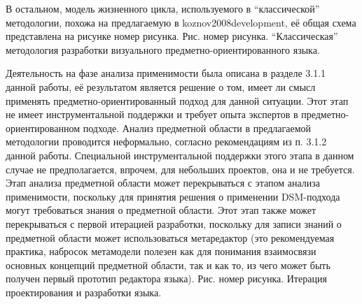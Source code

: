 В остальном, модель жизненного цикла, используемого в “классической” методологии, похожа на предлагаемую в koznov2008development, её общая схема представлена на рисунке номер рисунка.
Рис. номер рисунка. “Классическая” методология разработки визуального предметно-ориентированного языка.

	Деятельность на фазе анализа применимости была описана в разделе 3.1.1 данной работы, её результатом является решение о том, имеет ли смысл применять предметно-ориентированный подход для данной ситуации. Этот этап не имеет инструментальной поддержки и требует опыта экспертов в предметно-ориентированном подходе.
	Анализ предметной области в предлагаемой методологии проводится неформально, согласно рекомендациям из п. 3.1.2 данной работы. Специальной инструментальной поддержки этого этапа в данном случае не предполагается, впрочем, для небольших проектов, она и не требуется. Этап анализа предметной области может перекрываться с этапом анализа применимости, поскольку для принятия решения о применении DSM-подхода могут требоваться знания о предметной области. Этот этап также может перекрываться с первой итерацией разработки, поскольку для записи знаний о предметной области может использоваться метаредактор (это рекомендуемая практика, набросок метамодели полезен как для понимания взаимосвязи основных концепций предметной области, так и как то, из чего может быть получен первый прототип редактора языка).
Рис. номер рисунка. Итерация проектирования и разработки языка.

